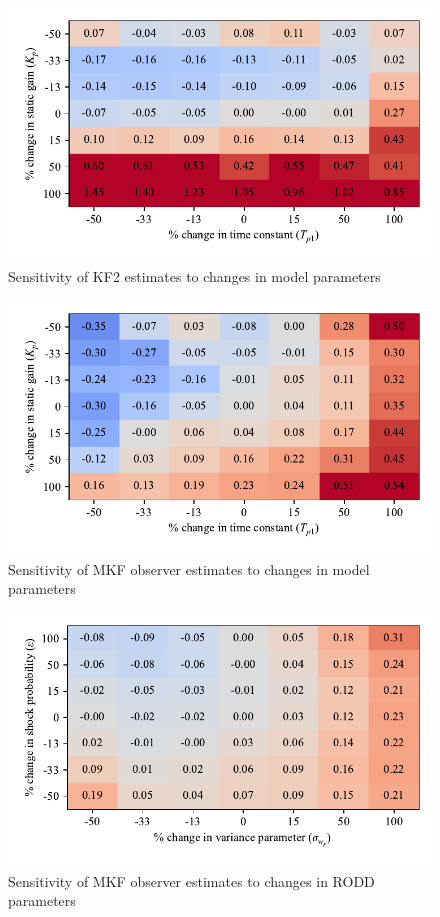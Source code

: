 \begin{figure}[htp]
	\centering
	\includegraphics[width=12cm]{images/rod_obs_sim_sens_model_KF2_MSE_y_est.pdf}
	\caption{Sensitivity of KF2 estimates to changes in model parameters}
	\label{fig:rod_obs_sim_sens_model_KF2_MSE_y_est}
\end{figure}

\begin{figure}[htp]
	\centering
	\includegraphics[width=12cm]{images/rod_obs_sim_sens_model_MKF_MSE_y_est.pdf}
	\caption{Sensitivity of MKF observer estimates to changes in model parameters}
	\label{fig:rod_obs_sim_sens_model_MKF_MSE_y_est}
\end{figure}

\begin{figure}[htp]
	\centering
	\includegraphics[width=12cm]{images/rod_obs_sim_sens_rod_MKF_MSE_y_est.pdf}
	\caption{Sensitivity of MKF observer estimates to changes in RODD parameters}
	\label{fig:rod_obs_sim_sens_rod_MKF_MSE_y_est}
\end{figure}


